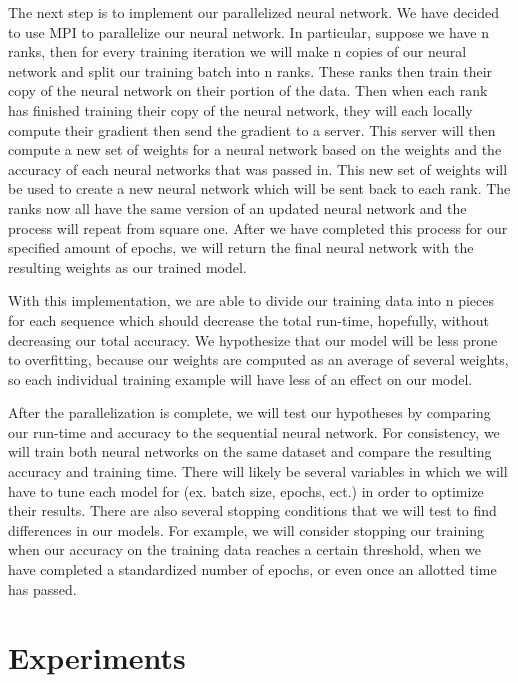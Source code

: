 \documentclass[11pt]{article}
\begin{document}
The next step is to implement our parallelized neural network. We have decided to use MPI to parallelize our neural network. In particular, suppose we have n ranks, then for every training iteration we will make n copies of our neural network and split our training batch into n ranks. These ranks then train their copy of the neural network on their portion of the data. Then when each rank has finished training their copy of the neural network, they will each locally compute their gradient then send the gradient to a server. This server will then compute a new set of weights for a neural network based on the weights and the accuracy of each neural networks that was passed in. This new set of weights will be used to create a new neural network which will be sent back to each rank. The ranks now all have the same version of an updated neural network and the process will repeat from square one. After we have completed this process for our specified amount of epochs, we will return the final neural network with the resulting weights as our trained model.

With this implementation, we are able to divide our training data into n pieces for each sequence which should decrease the total run-time, hopefully, without decreasing our total accuracy. We hypothesize that our model will be less prone to overfitting, because our weights are computed as an average of several weights, so each individual training example will have less of an effect on our model.

After the parallelization is complete, we will test our hypotheses by comparing our run-time and accuracy to the sequential neural network. For consistency, we will train both neural networks on the same dataset and compare the resulting accuracy and training time. There will likely be several variables in which we will have to tune each model for (ex. batch size, epochs, ect.) in order to optimize their results. There are also several stopping conditions that we will test to find differences in our models. For example, we will consider stopping our training when our accuracy on the training data reaches a certain threshold, when we have completed a standardized number of epochs, or even once an allotted time has passed.


\section {Experiments}\label{exper}
\end{document}
